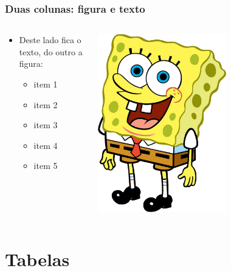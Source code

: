 \documentclass[mathsans,times]{beamer}
\begin{document}
\begin{frame}
	\frametitle{Duas colunas: figura e texto}
	\footnotesize
	\begin{columns}[onlytextwidth]
		\begin{column}{0.45\textwidth}
			\begin{itemize}
				\item Deste lado fica o texto, do outro a figura:
				\begin{itemize}
					\item item 1
					\item item 2
					\item item 3
					\item item 4
					\item item 5
				\end{itemize}
			\end{itemize}
		\end{column}
		\begin{column}{0.5\textwidth}
			\centering
			\includegraphics[width=0.6\textwidth]{img/sponge-bob.png}
		\end{column}
	\end{columns}
\end{frame}

\section{Tabelas}
\end{document}
